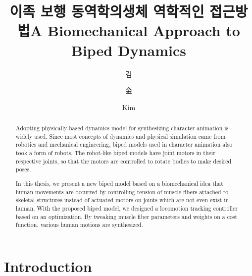 \documentclass[master,english,final]{kaist-ucs}
\title[korean] {이족 보행 동역학의\linebreak 생체 역학적인 접근방법}
\title[english]{A Biomechanical Approach to Biped Dynamics}
\author[korean] {김}{거 엽}
\author[chinese]{金}{거 엽}
\author[english]{Kim}{Geo Yeob}
\begin{document}

\begin{abstract}
Adopting physically-based dynamics model for synthesizing character animation is widely used.
Since most concepts of dynamics and physical simulation came from robotics and mechanical engineering,
biped models used in character animation also took a form of robots.
The robot-like biped models have joint motors in their respective joints,
so that the motors are controlled to rotate bodies to make desired poses.

In this thesis, we present a new biped model based on a biomechanical idea that
human movements are occurred by controlling tension of muscle fibers attached
to skeletal structures instead of actuated motors on joints which are not even exist in human.
With the proposed biped model, we designed a locomotion tracking controller based on an optimization.
By tweaking muscle fiber parameters and weights on a cost function, various human motions are synthesized.

\end{abstract}


\tableofcontents

\listoftables

\listoffigures


\chapter{Introduction}
\end{document}
